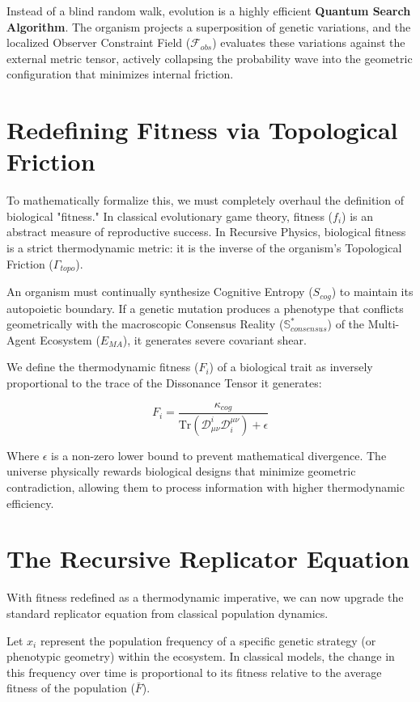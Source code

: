 \documentclass[12pt,openany]{book}
\begin{document}
Instead of a blind random walk, evolution is a highly efficient \textbf{Quantum Search Algorithm}. The organism projects a superposition of genetic variations, and the localized Observer Constraint Field ($\mathcal{F}_{obs}$) evaluates these variations against the external metric tensor, actively collapsing the probability wave into the geometric configuration that minimizes internal friction.

\section{Redefining Fitness via Topological Friction}
To mathematically formalize this, we must completely overhaul the definition of biological "fitness." In classical evolutionary game theory, fitness ($f_i$) is an abstract measure of reproductive success. In Recursive Physics, biological fitness is a strict thermodynamic metric: it is the inverse of the organism's Topological Friction ($\Gamma_{topo}$).

An organism must continually synthesize Cognitive Entropy ($S_{cog}$) to maintain its autopoietic boundary. If a genetic mutation produces a phenotype that conflicts geometrically with the macroscopic Consensus Reality ($\mathbb{S}^*_{consensus}$) of the Multi-Agent Ecosystem ($E_{MA}$), it generates severe covariant shear.

We define the thermodynamic fitness ($F_i$) of a biological trait as inversely proportional to the trace of the Dissonance Tensor it generates:

\begin{equation}
F_i = \frac{\kappa_{cog}}{\text{Tr}(\mathcal{D}_{\mu\nu}^i \mathcal{D}^{\mu\nu}_i) + \epsilon}
\end{equation}

Where $\epsilon$ is a non-zero lower bound to prevent mathematical divergence. The universe physically rewards biological designs that minimize geometric contradiction, allowing them to process information with higher thermodynamic efficiency.

\section{The Recursive Replicator Equation}
With fitness redefined as a thermodynamic imperative, we can now upgrade the standard replicator equation from classical population dynamics. 

Let $x_i$ represent the population frequency of a specific genetic strategy (or phenotypic geometry) within the ecosystem. In classical models, the change in this frequency over time is proportional to its fitness relative to the average fitness of the population ($\bar{F}$).
\end{document}
